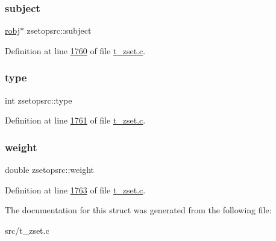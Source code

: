 \mbox{\label{structzsetopsrc_aae6157281e372c39d5906b3bd2421b35}} 
\subsubsection{\texorpdfstring{subject}{subject}}
{\footnotesize\ttfamily \hyperlink{structredisObject}{robj}$\ast$ zsetopsrc\+::subject}



Definition at line \hyperlink{t__zset_8c_source_l01760}{1760} of file \hyperlink{t__zset_8c_source}{t\+\_\+zset.\+c}.

\mbox{\label{structzsetopsrc_aec5580fb4ec98aa6a6f1448440d26f8d}} 
\subsubsection{\texorpdfstring{type}{type}}
{\footnotesize\ttfamily int zsetopsrc\+::type}



Definition at line \hyperlink{t__zset_8c_source_l01761}{1761} of file \hyperlink{t__zset_8c_source}{t\+\_\+zset.\+c}.

\mbox{\label{structzsetopsrc_a12e3749228806a6c73232644da7011d4}} 
\subsubsection{\texorpdfstring{weight}{weight}}
{\footnotesize\ttfamily double zsetopsrc\+::weight}



Definition at line \hyperlink{t__zset_8c_source_l01763}{1763} of file \hyperlink{t__zset_8c_source}{t\+\_\+zset.\+c}.



The documentation for this struct was generated from the following file\+:\begin{DoxyCompactItemize}
\item 
src/t\+\_\+zset.\+c\end{DoxyCompactItemize}
